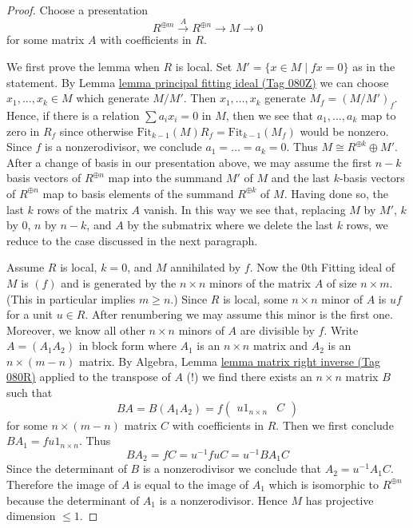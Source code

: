 \documentclass{amsart}
\theoremstyle{plain}
\theoremstyle{definition}
\theoremstyle{remark}
\numberwithin{equation}{subsection}
\begin{document}
\begin{proof}
Choose a presentation
$$
R^{\oplus m} \xrightarrow{A} R^{\oplus n} \to M \to 0
$$
for some matrix $A$ with coefficients in $R$.

\medskip\noindent
We first prove the lemma when $R$ is local.
Set $M' = \{x \in M \mid fx = 0\}$ as in the statement. By
Lemma \href{https://stacks.math.columbia.edu/tag/080Z}{lemma principal fitting ideal (Tag 080Z)} we can choose
$x_1, \ldots, x_k \in M$ which generate $M/M'$. Then
$x_1, \ldots, x_k$ generate $M_f = (M/M')_f$. Hence,
if there is a relation $\sum a_ix_i = 0$ in $M$,
then we see that $a_1, \ldots, a_k$ map to zero in $R_f$
since otherwise $\text{Fit}_{k - 1}(M) R_f = \text{Fit}_{k - 1}(M_f)$
would be nonzero.
Since $f$ is a nonzerodivisor, we conclude $a_1 = \ldots = a_k = 0$.
Thus $M \cong R^{\oplus k} \oplus M'$. After a change of basis
in our presentation above, we may assume the first $n - k$
basis vectors of $R^{\oplus n}$ map into the summand $M'$ of $M$
and the last $k$-basis vectors of $R^{\oplus n}$ map to
basis elements of the summand $R^{\oplus k}$ of $M$.
Having done so, the last $k$ rows of the matrix $A$ vanish.
In this way we see that, replacing $M$ by $M'$, $k$ by $0$,
$n$ by $n - k$, and $A$ by the submatrix where we
delete the last $k$ rows, we reduce to the case discussed
in the next paragraph.

\medskip\noindent
Assume $R$ is local, $k = 0$, and $M$ annihilated by $f$.
Now the $0$th Fitting ideal of $M$ is $(f)$ and is generated by the
$n \times n$ minors of the matrix $A$ of size $n \times m$.
(This in particular implies $m \geq n$.)
Since $R$ is local, some $n \times n$ minor of $A$ is $uf$
for a unit $u \in R$.
After renumbering we may assume this minor is the first one.
Moreover, we know all other $n \times n$ minors of $A$ are
divisible by $f$. Write $A = (A_1 A_2)$ in block form where
$A_1$ is an $n \times n$ matrix and $A_2$ is an
$n \times (m - n)$ matrix. By
Algebra, Lemma \href{https://stacks.math.columbia.edu/tag/080R}{lemma matrix right inverse (Tag 080R)}
applied to the transpose of $A$ (!) we find there exists an
$n \times n$ matrix $B$ such that
$$
BA = B(A_1 A_2) = f
\left(
\begin{matrix}
u 1_{n \times n} & C
\end{matrix}
\right)
$$
for some $n \times (m - n)$ matrix $C$ with coefficients in $R$.
Then we first conclude $BA_1 = fu 1_{n \times n}$.
Thus
$$
BA_2 = fC = u^{-1}fuC = u^{-1}BA_1C
$$
Since the determinant of $B$ is a nonzerodivisor we conclude
that $A_2 = u^{-1}A_1C$. Therefore the image of $A$ is equal
to the image of $A_1$ which is isomorphic to $R^{\oplus n}$
because the determinant of $A_1$ is a nonzerodivisor.
Hence $M$ has projective dimension $\leq 1$.


\end{proof}
\end{document}
